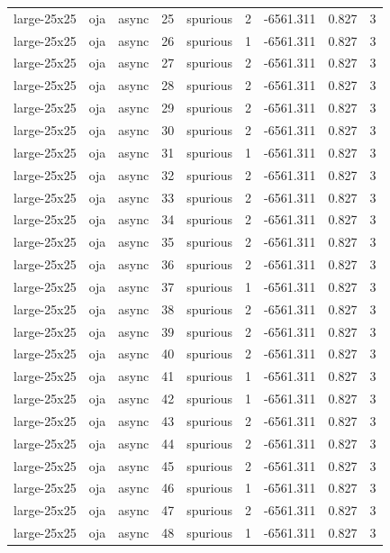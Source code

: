\begin{tabular}{lllrlrrrr}
large-25x25 & oja & async & 25 & spurious & 2 & -6561.311 & 0.827 & 3 \\
large-25x25 & oja & async & 26 & spurious & 1 & -6561.311 & 0.827 & 3 \\
large-25x25 & oja & async & 27 & spurious & 2 & -6561.311 & 0.827 & 3 \\
large-25x25 & oja & async & 28 & spurious & 2 & -6561.311 & 0.827 & 3 \\
large-25x25 & oja & async & 29 & spurious & 2 & -6561.311 & 0.827 & 3 \\
large-25x25 & oja & async & 30 & spurious & 2 & -6561.311 & 0.827 & 3 \\
large-25x25 & oja & async & 31 & spurious & 1 & -6561.311 & 0.827 & 3 \\
large-25x25 & oja & async & 32 & spurious & 2 & -6561.311 & 0.827 & 3 \\
large-25x25 & oja & async & 33 & spurious & 2 & -6561.311 & 0.827 & 3 \\
large-25x25 & oja & async & 34 & spurious & 2 & -6561.311 & 0.827 & 3 \\
large-25x25 & oja & async & 35 & spurious & 2 & -6561.311 & 0.827 & 3 \\
large-25x25 & oja & async & 36 & spurious & 2 & -6561.311 & 0.827 & 3 \\
large-25x25 & oja & async & 37 & spurious & 1 & -6561.311 & 0.827 & 3 \\
large-25x25 & oja & async & 38 & spurious & 2 & -6561.311 & 0.827 & 3 \\
large-25x25 & oja & async & 39 & spurious & 2 & -6561.311 & 0.827 & 3 \\
large-25x25 & oja & async & 40 & spurious & 2 & -6561.311 & 0.827 & 3 \\
large-25x25 & oja & async & 41 & spurious & 1 & -6561.311 & 0.827 & 3 \\
large-25x25 & oja & async & 42 & spurious & 1 & -6561.311 & 0.827 & 3 \\
large-25x25 & oja & async & 43 & spurious & 2 & -6561.311 & 0.827 & 3 \\
large-25x25 & oja & async & 44 & spurious & 2 & -6561.311 & 0.827 & 3 \\
large-25x25 & oja & async & 45 & spurious & 2 & -6561.311 & 0.827 & 3 \\
large-25x25 & oja & async & 46 & spurious & 1 & -6561.311 & 0.827 & 3 \\
large-25x25 & oja & async & 47 & spurious & 2 & -6561.311 & 0.827 & 3 \\
large-25x25 & oja & async & 48 & spurious & 1 & -6561.311 & 0.827 & 3 \\

\end{tabular}
